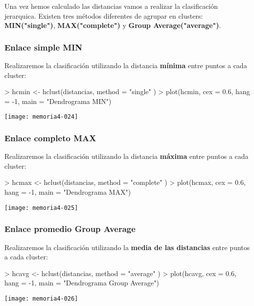 \documentclass [a4paper] {article}
\begin{document}
Una vez hemos calculado las distancias vamos a realizar la clasificación jerarquica. Existen tres métodos diferentes de agrupar en clusters:
\textbf{MIN("single")}, \textbf{MAX("complete")} y \textbf{Group Average("average")}.

\subsubsection{Enlace simple MIN}

Realizaremos la clasificación utilizando la distancia \textbf{mínima} entre puntos a cada cluster:

\begin{Schunk}
\begin{Sinput}
> hcmin <- hclust(distancias, method = "single" )
> plot(hcmin, cex = 0.6, hang = -1, main = "Dendrograma MIN")
\end{Sinput}
\end{Schunk}
\texttt{[image: memoria4-024]}


\subsubsection{Enlace completo MAX}

Realizaremos la clasificación utilizando la distancia \textbf{máxima} entre puntos a cada cluster:

\begin{Schunk}
\begin{Sinput}
> hcmax <- hclust(distancias, method = "complete" )
> plot(hcmax, cex = 0.6, hang = -1, main = "Dendrograma MAX")
\end{Sinput}
\end{Schunk}
\texttt{[image: memoria4-025]}

\subsubsection{Enlace promedio Group Average}

Realizaremos la clasificación utilizando la \textbf{media de las distancias} entre puntos a cada cluster:

\begin{Schunk}
\begin{Sinput}
> hcavg <- hclust(distancias, method = "average" )
> plot(hcavg, cex = 0.6, hang = -1, main = "Dendrograma Group Average")
\end{Sinput}
\end{Schunk}
\texttt{[image: memoria4-026]}
\end{document}
